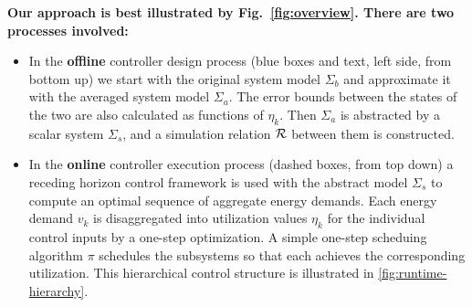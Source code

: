 \textbf{Our approach is best illustrated by Fig.~\ref{fig:overview}.
There are two processes involved:}
\begin{itemize}
\item In the \textbf{offline} controller design process (blue boxes and text, left side, from bottom
  up) we start with the original system model
  $\Sigma_b$ and approximate it with the averaged system model $\Sigma_a$. The
  error bounds between the states of the two are also calculated as functions
  of $\eta_k$. Then $\Sigma_a$ is abstracted by a scalar system $\Sigma_s$,
  and a simulation relation $\mathcal{R}$ between them is constructed.
  
\item In the \textbf{online} controller execution process (dashed
  boxes, from top down) a receding horizon control
  framework is used with the abstract model $\Sigma_s$ to compute an
  optimal sequence of aggregate energy demands. Each energy demand
  $v_k$ is disaggregated into utilization values $\eta_k$ for the
  individual control inputs by a one-step optimization. A simple
  one-step scheduing algorithm $\pi$ schedules the subsystems so that
  each achieves the corresponding utilization.  This hierarchical control structure is illustrated in \cref{fig:runtime-hierarchy}.
\end{itemize}


